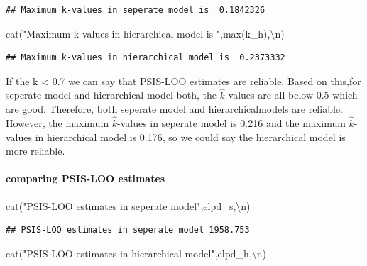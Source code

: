 \documentclass[
]{article}
\newenvironment{Shaded}{\begin{snugshade}}{\end{snugshade}}
\newcommand{\FunctionTok}[1]{\textcolor[rgb]{0.00,0.00,0.00}{#1}}
\newcommand{\NormalTok}[1]{#1}
\newcommand{\SpecialCharTok}[1]{\textcolor[rgb]{0.00,0.00,0.00}{#1}}
\newcommand{\StringTok}[1]{\textcolor[rgb]{0.31,0.60,0.02}{#1}}
\begin{document}
\begin{verbatim}
## Maximum k-values in seperate model is  0.1842326
\end{verbatim}

\begin{Shaded}
\begin{Highlighting}[]
\FunctionTok{cat}\NormalTok{(}\StringTok{"Maximum k{-}values in hierarchical model is "}\NormalTok{,}\FunctionTok{max}\NormalTok{(k\_h),}\StringTok{\textquotesingle{}}\SpecialCharTok{\textbackslash{}n}\StringTok{\textquotesingle{}}\NormalTok{)}
\end{Highlighting}
\end{Shaded}

\begin{verbatim}
## Maximum k-values in hierarchical model is  0.2373332
\end{verbatim}

If the k \textless{} 0.7 we can say that PSIS-LOO estimates are
reliable. Based on this,for seperate model and hierarchical model both,
the \(\hat{k}\)-values are all below 0.5 which are good. Therefore, both
seperate model and hierarchicalmodels are reliable. However, the maximum
\(\hat{k}\)-values in seperate model is 0.216 and the maximum
\(\hat{k}\)-values in hierarchical model is 0.176, so we could say the
hierarchical model is more reliable.

\hypertarget{comparing-psis-loo-estimates}{%
\paragraph{comparing PSIS-LOO
estimates}\label{comparing-psis-loo-estimates}}

\begin{Shaded}
\begin{Highlighting}[]
\FunctionTok{cat}\NormalTok{(}\StringTok{"PSIS{-}LOO estimates in seperate model"}\NormalTok{,elpd\_s,}\StringTok{\textquotesingle{}}\SpecialCharTok{\textbackslash{}n}\StringTok{\textquotesingle{}}\NormalTok{)}
\end{Highlighting}
\end{Shaded}

\begin{verbatim}
## PSIS-LOO estimates in seperate model 1958.753
\end{verbatim}

\begin{Shaded}
\begin{Highlighting}[]
\FunctionTok{cat}\NormalTok{(}\StringTok{"PSIS{-}LOO estimates in hierarchical model"}\NormalTok{,elpd\_h,}\StringTok{\textquotesingle{}}\SpecialCharTok{\textbackslash{}n}\StringTok{\textquotesingle{}}\NormalTok{)}
\end{Highlighting}
\end{Shaded}
\end{document}
